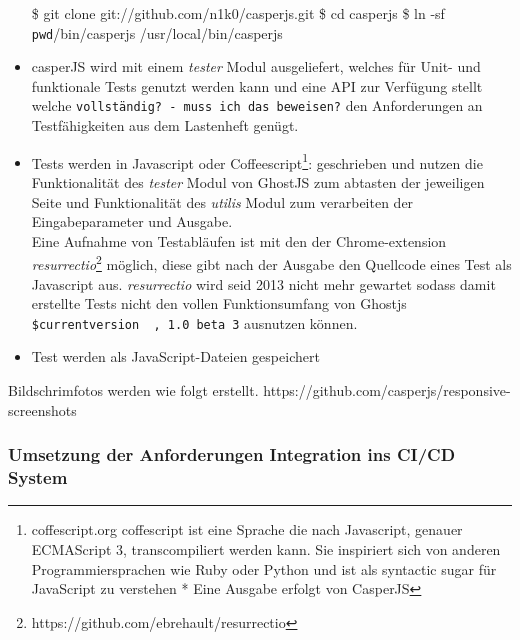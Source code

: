 \begin{itemize}
  \$ git clone git://github.com/n1k0/casperjs.git \$ cd casperjs \$ ln
  -sf \texttt{pwd}/bin/casperjs /usr/local/bin/casperjs
\item
  casperJS wird mit einem \emph{tester} Modul ausgeliefert, welches für
  Unit- und funktionale Tests genutzt werden kann und eine API zur
  Verfügung stellt welche
  \texttt{vollständig?\ -\ muss\ ich\ das\ beweisen?} den Anforderungen
  an Testfähigkeiten aus dem Lastenheft genügt.
\item
  Tests werden in Javascript oder Coffeescript\footnote{coffescript.org
    coffescript ist eine Sprache die nach Javascript, genauer ECMAScript
    3, transcompiliert werden kann. Sie inspiriert sich von anderen
    Programmiersprachen wie Ruby oder Python und ist als syntactic sugar
    für JavaScript zu verstehen * Eine Ausgabe erfolgt von CasperJS}:
  geschrieben und nutzen die Funktionalität des \emph{tester} Modul von
  GhostJS zum abtasten der jeweiligen Seite und Funktionalität des
  \emph{utilis} Modul zum verarbeiten der Eingabeparameter und
  Ausgabe.\\Eine Aufnahme von Testabläufen ist mit den der
  Chrome-extension \emph{resurrectio}\footnote{https://github.com/ebrehault/resurrectio}
  möglich, diese gibt nach der Ausgabe den Quellcode eines Test als
  Javascript aus. \emph{resurrectio} wird seid 2013 nicht mehr gewartet
  sodass damit erstellte Tests nicht den vollen Funktionsumfang von
  Ghostjs \texttt{\$currentversion\ \ ,\ 1.0\ beta\ 3} ausnutzen können.
\item
  Test werden als JavaScript-Dateien gespeichert
\end{itemize}

Bildschrimfotos werden wie folgt erstellt.
https://github.com/casperjs/responsive-screenshots

\subsubsection{Umsetzung der Anforderungen Integration ins CI/CD
System}\label{umsetzung-der-anforderungen-integration-ins-cicd-system}

